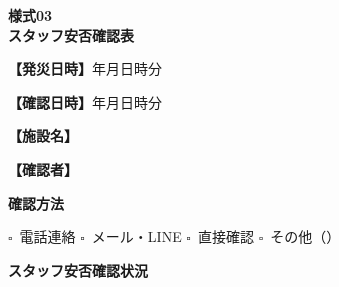 \documentclass[a4paper,12pt]{jarticle}
\newcommand{\checkbox}{$\square$\ }
\newcommand{\underlinespace}[1]{\underline{\hspace{#1}}}
\begin{document}
\begin{center}
{\Large\textbf{様式03}}\\
\vspace{3mm}
{\Large\textbf{スタッフ安否確認表}}
\end{center}
\vspace{5mm}

\noindent
\textbf{【発災日時】}\underlinespace{2cm}年\underlinespace{1cm}月\underlinespace{1cm}日\underlinespace{1cm}時\underlinespace{1cm}分

\vspace{3mm}

\noindent
\textbf{【確認日時】}\underlinespace{2cm}年\underlinespace{1cm}月\underlinespace{1cm}日\underlinespace{1cm}時\underlinespace{1cm}分

\vspace{3mm}

\noindent
\textbf{【施設名】} \underlinespace{10cm}

\vspace{3mm}

\noindent
\textbf{【確認者】} \underlinespace{10cm}

\vspace{8mm}

\begin{center}
\textbf{\large 確認方法}
\end{center}

\vspace{3mm}

\noindent
\checkbox 電話連絡 \quad \checkbox メール・LINE \quad \checkbox 直接確認 \quad \checkbox その他（\underlinespace{4cm}）

\vspace{8mm}

\begin{center}
\textbf{\large スタッフ安否確認状況}
\end{center}

\vspace{3mm}
\end{document}
